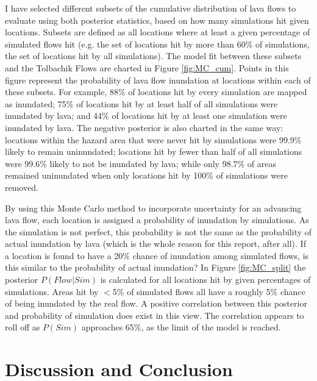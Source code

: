 \documentclass[12pt,letter]{article}
\begin{document}
I have selected different subsets of the cumulative distribution of lava flows to evaluate using both posterior statistics, based on how many simulations hit given locations. Subsets are defined as all locations where at least a given percentage of simulated flows hit (e.g. the set of locations hit by more than 60\% of simulations, the set of locations hit by all simulations). The model fit between these subsets and the Tolbachik Flows are charted in Figure \ref{fig:MC_cum}. Points in this figure represent the probability of lava flow inundation at locations within each of these subsets. For example, 88\% of locations hit by every simulation are mapped as inundated; 75\% of locations hit by at least half of all simulations were inundated by lava; and 44\% of locations hit by at least one simulation were inundated by lava. The negative posterior is also charted in the same way: locations within the hazard area that were never hit by simulations were 99.9\% likely to remain uninundated; locations hit by fewer than half of all simulations were 99.6\% likely to not be inundated by lava; while only 98.7\% of areas remained uninundated when only locations hit by 100\% of simulations were removed.

By using this Monte Carlo method to incorporate uncertainty for an advancing lava flow, each location is assigned a probability of inundation by simulations. As the simulation is not perfect, this probability is not the same as the probability of actual inundation by lava (which is the whole reason for this report, after all). If a location is found to have a 20\% chance of inundation among simulated flows, is this similar to the probability of actual inundation? In Figure \ref{fig:MC_split} the posterior $P(Flow|Sim)$ is calculated for all locations hit by given percentages of simulations. Areas hit by $<$5\% of simulated flows all have a roughly 5\% chance of being inundated by the real flow. A positive correlation between this posterior and probability of simulation does exist in this view. The correlation appears to roll off as $P(Sim)$ approaches 65\%, as the limit of the model is reached.




\section{Discussion and Conclusion}\label{sec:discussion}
\end{document}
